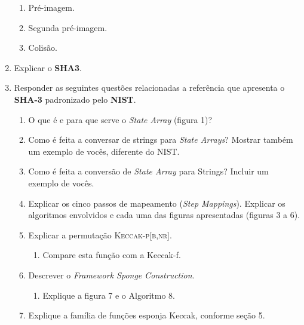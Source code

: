 \documentclass[conference]{IEEEtran}
\begin{document}
\begin{enumerate}
\begin{enumerate}
\item Pré-imagem.

\item Segunda pré-imagem.

\item Colisão.

\end{enumerate}

\item Explicar o \textbf{SHA3}.

\item Responder as seguintes questões relacionadas a referência\cite{nist} que
apresenta o \textbf{SHA-3} padronizado pelo \textbf{NIST}.

\begin{enumerate}

\item O que é e para que serve o \textit{State Array} (figura 1)?

\item Como é feita a conversar de strings para \textit{State Arrays}? Mostrar
também um exemplo de vocês, diferente do NIST.

\item Como é feita a conversão de \textit{State Array} para Strings? Incluir um
exemplo de vocês.

\item Explicar os cinco passos de mapeamento (\textit{Step Mappings}). Explicar
os algoritmos envolvidos e cada uma das figuras apresentadas (figuras 3 a 6).

\item Explicar a permutação \textsc{Keccak-p[b,nr]}.

\begin{enumerate}

\item Compare esta função com a Keccak-f.

\end{enumerate}

\item Descrever o \textit{Framework Sponge Construction}.

\begin{enumerate}

\item Explique a figura 7 e o Algoritmo 8.

\end{enumerate}

\item Explique a família de funções esponja Keccak, conforme seção 5.


\end{enumerate}
\end{enumerate}
\end{document}
